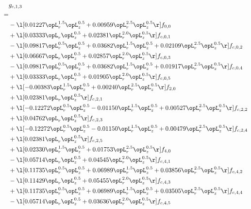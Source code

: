 \begin{alignat}{2} 
\label{eq:g_13_0} 
& g_{c,1,3} \nonumber \\ 
 = \\ 
& - \l[  0.01227 \opL_r^{1.5} \opL_z^{0.5} +  0.00959 \opL_r^{2.5} \opL_z^{0.5}  \r] f_{0,0} \nonumber \\ 
& + \l[  0.03333 \opL_r \opL_z^{0.5} +  0.02381 \opL_r^{2.0} \opL_z^{0.5}  \r] f_{c,0,1} \nonumber \\ 
& - \l[  0.09817 \opL_r^{0.5} \opL_z^{0.5} +  0.03682 \opL_r^{1.5} \opL_z^{0.5} +  0.02109 \opL_r^{2.5} \opL_z^{0.5}  \r] f_{c,0,2} \nonumber \\ 
& + \l[  0.06667 \opL_r \opL_z^{0.5} +  0.02857 \opL_r^{2.0} \opL_z^{0.5}  \r] f_{c,0,3} \nonumber \\ 
& - \l[  0.09817 \opL_r^{0.5} \opL_z^{0.5} +  0.03682 \opL_r^{1.5} \opL_z^{0.5} +  0.01917 \opL_r^{2.5} \opL_z^{0.5}  \r] f_{c,0,4} \nonumber \\ 
& + \l[  0.03333 \opL_r \opL_z^{0.5} +  0.01905 \opL_r^{2.0} \opL_z^{0.5}  \r] f_{c,0,5} \nonumber \\ 
& + \l[  -0.00383 \opL_r^{1.5} \opL_z^{0.5} +  0.00240 \opL_r^{2.5} \opL_z^{0.5}  \r] f_{2,0} \nonumber \\ 
& + \l[  0.02381 \opL_r \opL_z^{0.5}  \r] f_{c,2,1} \nonumber \\ 
& + \l[  -0.12272 \opL_r^{0.5} \opL_z^{0.5}   -0.01150 \opL_r^{1.5} \opL_z^{0.5} +  0.00527 \opL_r^{2.5} \opL_z^{0.5}  \r] f_{c,2,2} \nonumber \\ 
& + \l[  0.04762 \opL_r \opL_z^{0.5}  \r] f_{c,2,3} \nonumber \\ 
& + \l[  -0.12272 \opL_r^{0.5} \opL_z^{0.5}   -0.01150 \opL_r^{1.5} \opL_z^{0.5} +  0.00479 \opL_r^{2.5} \opL_z^{0.5}  \r] f_{c,2,4} \nonumber \\ 
& + \l[  0.02381 \opL_r \opL_z^{0.5}  \r] f_{c,2,5} \nonumber \\ 
& + \l[  0.02330 \opL_r^{1.5} \opL_z^{0.5} +  0.01753 \opL_r^{2.5} \opL_z^{0.5}  \r] f_{4,0} \nonumber \\ 
& - \l[  0.05714 \opL_r \opL_z^{0.5} +  0.04545 \opL_r^{2.0} \opL_z^{0.5}  \r] f_{c,4,1} \nonumber \\ 
& + \l[  0.11735 \opL_r^{0.5} \opL_z^{0.5} +  0.06989 \opL_r^{1.5} \opL_z^{0.5} +  0.03856 \opL_r^{2.5} \opL_z^{0.5}  \r] f_{c,4,2} \nonumber \\ 
& - \l[  0.11429 \opL_r \opL_z^{0.5} +  0.05455 \opL_r^{2.0} \opL_z^{0.5}  \r] f_{c,4,3} \nonumber \\ 
& + \l[  0.11735 \opL_r^{0.5} \opL_z^{0.5} +  0.06989 \opL_r^{1.5} \opL_z^{0.5} +  0.03505 \opL_r^{2.5} \opL_z^{0.5}  \r] f_{c,4,4} \nonumber \\ 
& - \l[  0.05714 \opL_r \opL_z^{0.5} +  0.03636 \opL_r^{2.0} \opL_z^{0.5}  \r] f_{c,4,5} \nonumber \\ 
\end{alignat} 


